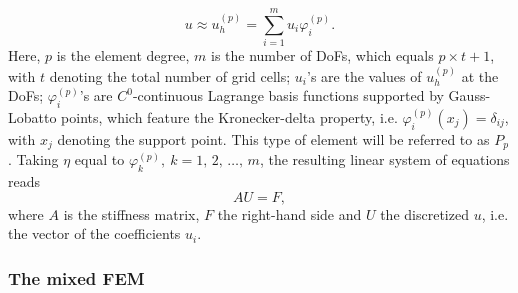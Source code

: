 \documentclass[review,3p]{elsarticle}
\newcommand{\apostrophe}[1]{\rq{#1}}			%
\begin{document}
\begin{equation}
 u \approx u_h ^{(p)} = \sum _ {i=1} ^{m} u _{i} \varphi _{i}^{(p)}. \label{General_SM_u_approx}%
\end{equation}
Here, $p$ is the element degree, $m$ is the number of DoFs, which equals $p \times t + 1$, with $t$ denoting the total number of grid cells; $u_i$\apostrophe s are the values of $u_h^{(p)}$ at the DoFs; $\varphi _{i}^{(p)}$\apostrophe s are $C^0$-continuous Lagrange basis functions supported by Gauss-Lobatto points, which feature the Kronecker-delta property, i.e. $\varphi _{i}^{(p)} (x_j)=\delta_{ij}$, with $x_j$ denoting the support point. This type of element will be referred to as $P_p$. Taking $\eta$ equal to $\varphi ^{(p)}_{k},~ k=1, \,2, \, \ldots , \, m$, the resulting linear system of equations reads
\begin{equation}
 A {U} = F,				\label{matrix equation std FEM}
\end{equation}
where $A$ is the stiffness matrix, $F$ the right-hand side and $U$ the discretized $u$, i.e. the vector of the coefficients $u_i$.

\subsubsection{The mixed FEM}
\end{document}
